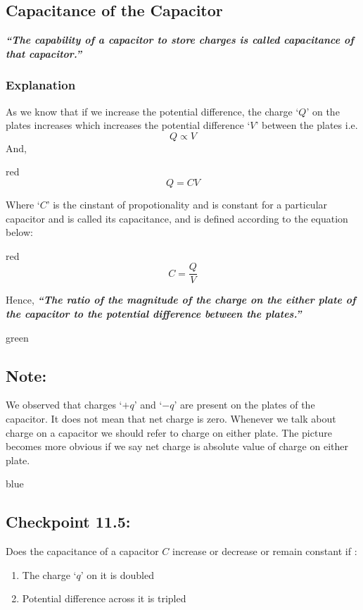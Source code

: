 \subsection{Capacitance of the Capacitor}
\textit{
  \textbf{“The capability of a capacitor to store charges is called
capacitance of that capacitor.”}}
\subsubsection*{Explanation}
As we know that if we increase the potential difference, the charge `$Q$' on
the plates increases
which increases the potential difference `$V$' between the plates i.e.
\begin{equation}\nonumber
  Q \propto V
\end{equation}
And,
\begin{mybox}{red}{}
\begin{equation}\label{eq:11.68}
  Q =  CV
\end{equation}
\end{mybox}
\noindent Where `$C$' is the cinstant of propotionality and is constant for a
particular capacitor and is
called its capacitance, and is defined according to the equation below:
\begin{mybox}{red}{}
  \begin{equation}\label{eq:11.69}
    C =  \frac{Q}{V}
  \end{equation}
  \end{mybox}
\noindent Hence, \textit{\textbf{“The ratio of the magnitude of the charge on the either plate
of the capacitor to the potential difference between the plates.”}}
\begin{mybox}{green}{}
\subsection*{\note{}Note:}
We observed that charges `$+q$' and `$-q$' are present on the plates of the
capacitor. It does not mean that net charge is zero. Whenever we talk
about charge on a capacitor we should refer to charge on either plate.
The picture becomes more obvious if we say net charge is absolute value
of charge on either plate.
\end{mybox}
\begin{mybox}{blue}{}
  \subsection*{\checkpoint{} Checkpoint 11.5:}
  Does the capacitance of a capacitor $C$ increase or decrease or remain
  constant if :
  \begin{enumerate}[label = (\alph*)]
  \item The charge `$q$' on it is doubled
  \item Potential difference across it is tripled
  \end{enumerate}
\end{mybox}

